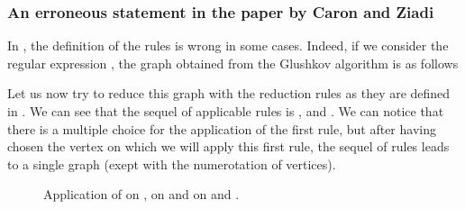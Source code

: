 \documentclass[11pt]{article}
\begin{document}
\subsubsection*{An erroneous statement in the paper by Caron and Ziadi}
In \cite{CZ97}, the definition of the  rules is wrong in some cases. Indeed, if we consider the regular expression , the graph obtained from the Glushkov algorithm is as follows


Let us now try to reduce this graph with the reduction rules as they are defined in \cite{CZ97}. We can see that the sequel of applicable rules is ,  and . We can notice that there is a multiple choice for the application of the first  rule, but after having chosen the vertex on which we will apply this first rule, the sequel of rules leads to a single graph (exept with the numerotation of vertices).
\begin{figure}[H]
\caption{Application of  on ,  on  and  on  and .}
\end{figure}
\end{document}
